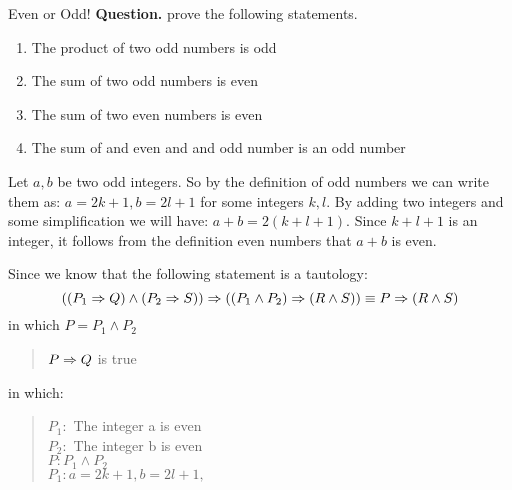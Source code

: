 \begin{example}{Even or Odd!}
	\textbf{Question.} prove the following statements.
	\begin{enumerate}
		\item The product of two odd numbers is odd
		\item The sum of two odd numbers is even
		\item The sum of two even numbers is even
		\item The sum of and even and and odd number is an odd number
	\end{enumerate}

	 Let $ a,b $ be two odd integers. So by the definition of odd numbers we can write them as: $ a = 2k+1, b = 2l+1 $ for some integers $ k,l $. By adding two integers and some simplification we will have: $ a+b = 2(k+l+1) $. Since $ k+l+1 $ is an integer, it follows from the definition even numbers that $ a+b $ is even.
	
	Since we know that the following statement is a tautology:
	\[ ((P_1 \Rightarrow Q) \wedge (P_2 \Rightarrow S)) \Rightarrow ((P_1 \wedge P_2) \Rightarrow (R \wedge S)) \equiv P \Rightarrow (R \wedge S) \]
	in which $ P = P_1 \wedge P_2$
	\begin{quote}
		\centering 
		$ P \Rightarrow Q $ is true
	\end{quote}
	in which:
	\begin{quote}
		\centering
		$ P_1: $ The integer a is even \\
		$ P_2: $ The integer b is even \\
		$ P: P_1 \wedge P_2 $ \\
		$ P_1: a=2k+1, b=2l+1,$ 
	\end{quote}
	
\end{example}